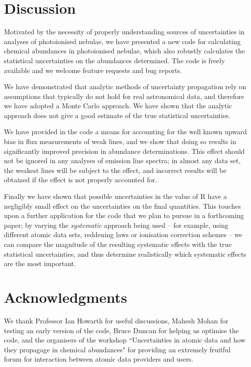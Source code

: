 \documentclass[useAMS,usenatbib]{mn2e}
\begin{document}
\section{Discussion}

Motivated by the necessity of properly understanding sources of uncertainties in analyses of photoionised nebulae, we have presented a new code for calculating chemical abundances in photoionised nebulae, which also robustly calculates the statistical uncertainties on the abundances determined.  The code is freely available and we welcome feature requests and bug reports.

We have demonstrated that analytic methods of uncertainty propagation rely on assumptions that typically do not hold for real astronomical data, and therefore we have adopted a Monte Carlo approach.  We have shown that the analytic approach does not give a good estimate of the true statistical uncertainties.

We have provided in the code a means for accounting for the well known upward bias in flux measurements of weak lines, and we show that doing so results in significantly improved precision in abundance determinations.  This effect should not be ignored in any analyses of emission line spectra; in almost any data set, the weakest lines will be subject to the effect, and incorrect results will be obtained if the effect is not properly accounted for.

Finally we have shown that possible uncertainties in the value of R have a negligibly small effect on the uncertainties on the final quantities.  This touches upon a further application for the code that we plan to pursue in a forthcoming paper; by varying the {\it systematic} approach being used -- for example, using different atomic data sets, reddening laws or ionisation correction schemes -- we can compare the magnitude of the resulting systematic effects with the true statistical uncertainties, and thus determine realistically which systematic effects are the most important.

\section*{Acknowledgments}

We thank Professor Ian Howarth for useful discussions, Mahesh Mohan for testing an early version of the code, Bruce Duncan for helping us optimise the code, and the organisers of the workshop ``Uncertainties in atomic data and how they propagage in chemical abundances" for providing an extremely fruitful forum for interaction between atomic data providers and users.





\label{lastpage}
\end{document}
